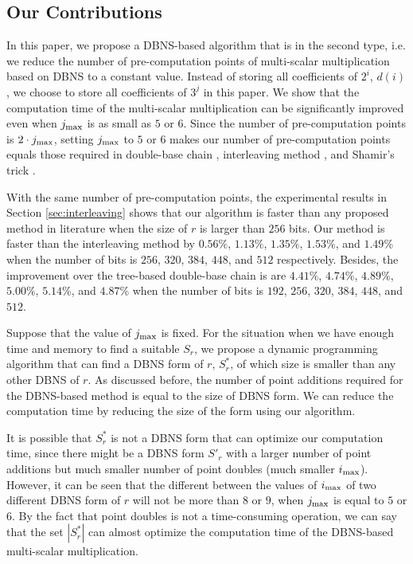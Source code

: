 \subsection{Our Contributions}

In this paper, we propose a DBNS-based algorithm that is in the second type, i.e. we reduce the number of pre-computation points of multi-scalar multiplication based on DBNS to a constant value. Instead of storing all coefficients of $2^i$, $d(i)$, we choose to store all coefficients of $3^j$ in this paper. We show that the computation time of the multi-scalar multiplication can be significantly improved even when $j_{\rm max}$ is as small as $5$ or $6$. Since the number of pre-computation points is $2 \cdot j_{\rm max}$, setting $j_{\rm max}$ to $5$ or $6$ makes our number of pre-computation points equals those required in double-base chain \cite{experiment,dbc1}, interleaving method \cite{interleaving}, and Shamir's trick \cite{enlarged4}.

With the same number of pre-computation points, the experimental results in Section \ref{sec:interleaving}
shows that our algorithm is faster than any proposed method in literature when the size of $r$ is larger than $256$ bits.
Our method is faster than the interleaving method by $0.56\%$, $1.13\%$, $1.35\%$, $1.53\%$, and $1.49\%$
when the number of bits is $256$, $320$, $384$, $448$, and $512$ respectively.
Besides, the improvement over the tree-based double-base chain is are 
$4.41\%$, $4.74\%$, $4.89\%$, $5.00\%$, $5.14\%$, and $4.87\%$ when the number of bits is $192$, $256$, $320$, $384$, $448$, and $512$.

Suppose that the value of $j_{\rm max}$ is fixed. For the situation when we have enough time and memory to find a suitable $S_r$, we propose a dynamic programming algorithm that can find a DBNS form of $r$, $S^*_r$, of which size is smaller than any other DBNS of $r$. As discussed before, the number of point additions required for the DBNS-based method is equal to the size of DBNS form. We can reduce the computation time by reducing the size of the form using our algorithm.

It is possible that $S^*_r$ is not a DBNS form that can optimize our computation time, since there might be a DBNS form $S'_r$ with a larger number of point additions but much smaller number of point doubles (much smaller $i_{\rm max}$). However, it can be seen that the different between the values of $i_{\rm max}$ of two different DBNS form of $r$ will not be more than $8$ or $9$, when $j_{\rm max}$ is equal to $5$ or $6$. By the fact that point doubles is not a time-consuming operation, we can say that the set $|S^*_r|$ can almost optimize the computation time of the DBNS-based multi-scalar multiplication.

